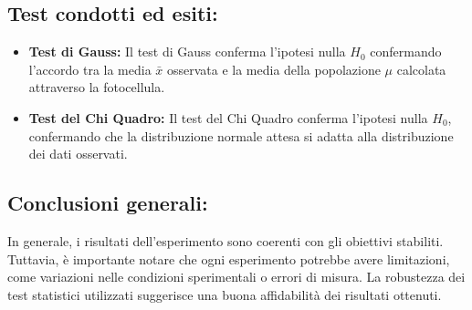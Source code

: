 \documentclass{article}
\begin{document}
\subsection{Test condotti ed esiti:}
\begin{itemize}
	\item \textbf{Test di Gauss:} Il test di Gauss conferma l'ipotesi nulla $H_0$ confermando l'accordo tra la media $\bar{x}$ osservata e la media della popolazione $\mu$ calcolata attraverso la fotocellula.
	\item \textbf{Test del Chi Quadro:} Il test del Chi Quadro conferma l'ipotesi nulla $H_0$, confermando che la distribuzione normale attesa si adatta alla distribuzione dei dati osservati.
\end{itemize}

\subsection{Conclusioni generali:}
In generale, i risultati dell'esperimento sono coerenti con gli obiettivi stabiliti. Tuttavia, è importante notare che ogni esperimento potrebbe avere limitazioni, come variazioni nelle condizioni sperimentali o errori di misura. La robustezza dei test statistici utilizzati suggerisce una buona affidabilità dei risultati ottenuti.
\end{document}
